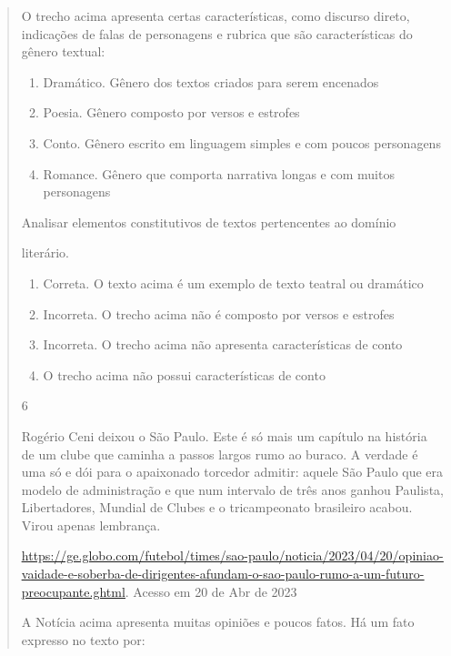 {\begin{quote}
{\begin{itemize}
\begin{itemize}
O trecho acima apresenta certas características, como discurso direto,
indicações de falas de personagens e rubrica que são características do
gênero textual:

\begin{enumerate}

\item
  Dramático. Gênero dos textos criados para serem encenados
\item
  Poesia. Gênero composto por versos e estrofes
\item
  Conto. Gênero escrito em linguagem simples e com poucos personagens
\item
  Romance. Gênero que comporta narrativa longas e com muitos personagens
\end{enumerate}

Analisar elementos constitutivos de textos pertencentes ao domínio

literário.

\begin{enumerate}
\def\labelenumi{\arabic{enumi}.}
\item
  Correta. O texto acima é um exemplo de texto teatral ou dramático
\item
  Incorreta. O trecho acima não é composto por versos e estrofes
\item
  Incorreta. O trecho acima não apresenta características de conto
\item
  O trecho acima não possui características de conto
\end{enumerate}

\num{6}

Rogério Ceni deixou o São Paulo. Este é só mais um capítulo na história
de um clube que caminha a passos largos rumo ao buraco. A verdade é uma
só e dói para o apaixonado torcedor admitir: aquele São Paulo que era
modelo de administração e que num intervalo de três anos ganhou
Paulista, Libertadores, Mundial de Clubes e o tricampeonato brasileiro
acabou. Virou apenas lembrança.

\href{https://ge.globo.com/futebol/times/sao-paulo/noticia/2023/04/20/opiniao-vaidade-e-soberba-de-dirigentes-afundam-o-sao-paulo-rumo-a-um-futuro-preocupante.ghtml}{\uline{https://ge.globo.com/futebol/times/sao-paulo/noticia/2023/04/20/opiniao-vaidade-e-soberba-de-dirigentes-afundam-o-sao-paulo-rumo-a-um-futuro-preocupante.ghtml}}.
Acesso em 20 de Abr de 2023

A Notícia acima apresenta muitas opiniões e poucos fatos. Há um fato
expresso no texto por:


\end{itemize}
\end{itemize}}
\end{quote}}

